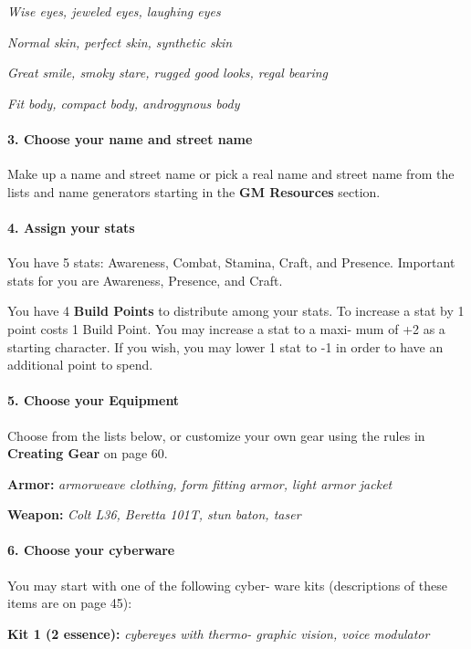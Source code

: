 \begin{multicols}{3}
\textit{Wise eyes, jeweled eyes, laughing eyes}

\textit{Normal skin, perfect skin, synthetic skin}

\textit{Great smile, smoky stare, rugged good looks,
regal bearing}

\textit{Fit body, compact body, androgynous body}

\paragraph{3.  Choose your name and street name}

Make up a name and street name or pick a real
name and street name from the lists and name
generators starting in the \textbf{GM Resources} section.

\paragraph{4.  Assign your stats}

You have 5 stats: Awareness, Combat, Stamina,
Craft, and Presence. Important stats for you are
Awareness, Presence, and Craft.

You have 4 \textbf{Build Points} to distribute among
your stats. To increase a stat by 1 point costs 1
Build Point. You may increase a stat to a maxi-
mum of +2 as a starting character. If you wish,
you may lower 1 stat to -1 in order to have an
additional point to spend.

\paragraph{5.  Choose your Equipment}

Choose from the lists below, or customize your
own gear using the rules in \textbf{Creating Gear} on
page 60.

\textbf{Armor:} \textit{armorweave clothing, form fitting
armor, light armor jacket}

\textbf{Weapon:} \textit{Colt L36, Beretta 101T, stun baton,
taser}

\paragraph{6.  Choose your cyberware}

You may start with one of the following cyber-
ware kits (descriptions of these items are on
page 45):

\textbf{Kit 1 (2 essence):} \textit{cybereyes with thermo-
graphic vision, voice modulator}


\end{multicols}
